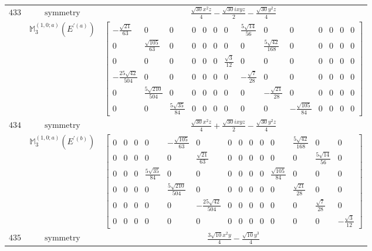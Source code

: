 \documentclass[fleqn,8pt,landscape]{jsarticle}
\begin{document}
\begin{longtable}{ccc}
$ 433 $ & $ \text{symmetry} $ & $ \frac{\sqrt{30} x^{2} z}{4} - \frac{\sqrt{30} i x y z}{2} - \frac{\sqrt{30} y^{2} z}{4} $ \\
$  $ & $ \mathbb{M}_{3}^{(1,0;a)}(E^{\prime(a)}) $ & $ \begin{bmatrix} - \frac{\sqrt{21}}{63} & 0 & 0 & 0 & 0 & 0 & 0 & \frac{5 \sqrt{14}}{56} & 0 & 0 & 0 & 0 & 0 & 0 \\ 0 & \frac{\sqrt{105}}{63} & 0 & 0 & 0 & 0 & 0 & 0 & \frac{5 \sqrt{42}}{168} & 0 & 0 & 0 & 0 & 0 \\ 0 & 0 & 0 & 0 & 0 & 0 & \frac{\sqrt{3}}{12} & 0 & 0 & 0 & 0 & 0 & 0 & 0 \\ - \frac{25 \sqrt{42}}{504} & 0 & 0 & 0 & 0 & 0 & 0 & - \frac{\sqrt{7}}{28} & 0 & 0 & 0 & 0 & 0 & 0 \\ 0 & \frac{5 \sqrt{210}}{504} & 0 & 0 & 0 & 0 & 0 & 0 & - \frac{\sqrt{21}}{28} & 0 & 0 & 0 & 0 & 0 \\ 0 & 0 & \frac{5 \sqrt{35}}{84} & 0 & 0 & 0 & 0 & 0 & 0 & - \frac{\sqrt{105}}{84} & 0 & 0 & 0 & 0 \end{bmatrix} $ \\ \hline
$ 434 $ & $ \text{symmetry} $ & $ \frac{\sqrt{30} x^{2} z}{4} + \frac{\sqrt{30} i x y z}{2} - \frac{\sqrt{30} y^{2} z}{4} $ \\
$  $ & $ \mathbb{M}_{3}^{(1,0;a)}(E^{\prime(b)}) $ & $ \begin{bmatrix} 0 & 0 & 0 & 0 & - \frac{\sqrt{105}}{63} & 0 & 0 & 0 & 0 & 0 & 0 & \frac{5 \sqrt{42}}{168} & 0 & 0 \\ 0 & 0 & 0 & 0 & 0 & \frac{\sqrt{21}}{63} & 0 & 0 & 0 & 0 & 0 & 0 & \frac{5 \sqrt{14}}{56} & 0 \\ 0 & 0 & 0 & \frac{5 \sqrt{35}}{84} & 0 & 0 & 0 & 0 & 0 & 0 & \frac{\sqrt{105}}{84} & 0 & 0 & 0 \\ 0 & 0 & 0 & 0 & \frac{5 \sqrt{210}}{504} & 0 & 0 & 0 & 0 & 0 & 0 & \frac{\sqrt{21}}{28} & 0 & 0 \\ 0 & 0 & 0 & 0 & 0 & - \frac{25 \sqrt{42}}{504} & 0 & 0 & 0 & 0 & 0 & 0 & \frac{\sqrt{7}}{28} & 0 \\ 0 & 0 & 0 & 0 & 0 & 0 & 0 & 0 & 0 & 0 & 0 & 0 & 0 & - \frac{\sqrt{3}}{12} \end{bmatrix} $ \\ \hline
$ 435 $ & $ \text{symmetry} $ & $ \frac{3 \sqrt{10} x^{2} y}{4} - \frac{\sqrt{10} y^{3}}{4} $ \\

\end{longtable}
\end{document}
